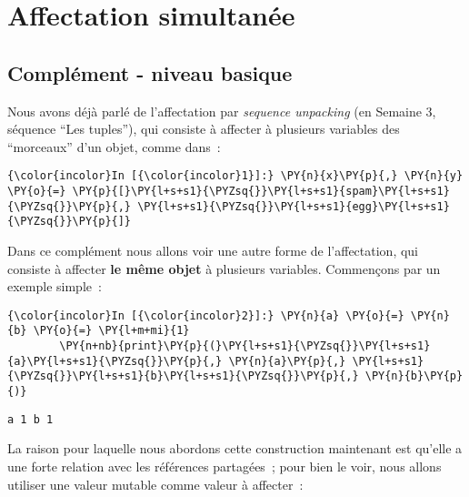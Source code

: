     \hypertarget{affectation-simultanuxe9e}{%
\section{Affectation simultanée}\label{affectation-simultanuxe9e}}

    \hypertarget{compluxe9ment---niveau-basique}{%
\subsection{Complément - niveau
basique}\label{compluxe9ment---niveau-basique}}

    Nous avons déjà parlé de l'affectation par \emph{sequence unpacking} (en
Semaine 3, séquence ``Les tuples''), qui consiste à affecter à plusieurs
variables des ``morceaux'' d'un objet, comme dans~:

    \begin{Verbatim}[commandchars=\\\{\}]
{\color{incolor}In [{\color{incolor}1}]:} \PY{n}{x}\PY{p}{,} \PY{n}{y} \PY{o}{=} \PY{p}{[}\PY{l+s+s1}{\PYZsq{}}\PY{l+s+s1}{spam}\PY{l+s+s1}{\PYZsq{}}\PY{p}{,} \PY{l+s+s1}{\PYZsq{}}\PY{l+s+s1}{egg}\PY{l+s+s1}{\PYZsq{}}\PY{p}{]}
\end{Verbatim}


    Dans ce complément nous allons voir une autre forme de l'affectation,
qui consiste à affecter \textbf{le même objet} à plusieurs variables.
Commençons par un exemple simple~:

    \begin{Verbatim}[commandchars=\\\{\}]
{\color{incolor}In [{\color{incolor}2}]:} \PY{n}{a} \PY{o}{=} \PY{n}{b} \PY{o}{=} \PY{l+m+mi}{1}
        \PY{n+nb}{print}\PY{p}{(}\PY{l+s+s1}{\PYZsq{}}\PY{l+s+s1}{a}\PY{l+s+s1}{\PYZsq{}}\PY{p}{,} \PY{n}{a}\PY{p}{,} \PY{l+s+s1}{\PYZsq{}}\PY{l+s+s1}{b}\PY{l+s+s1}{\PYZsq{}}\PY{p}{,} \PY{n}{b}\PY{p}{)}
\end{Verbatim}


    \begin{Verbatim}[commandchars=\\\{\}]
a 1 b 1

    \end{Verbatim}

    La raison pour laquelle nous abordons cette construction maintenant est
qu'elle a une forte relation avec les références partagées~; pour bien
le voir, nous allons utiliser une valeur mutable comme valeur à
affecter~:

